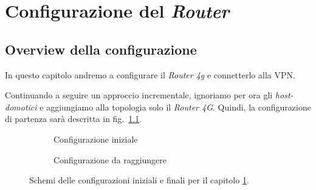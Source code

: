 
\chapter{Configurazione del \textit{Router} \ok \ok}
\label{ch:configurazione-router}

\section{Overview della configurazione \ok}

In questo capitolo andremo a configurare il \textit{Router 4g} e connetterlo alla VPN.

Continuando a seguire un approccio incrementale, ignoriamo per ora gli \textit{host-domotici} e aggiungiamo alla topologia solo il \textit{Router 4G}. Quindi, la configurazione di partenza sarà descritta in fig.~\ref{fig:conf-init-router}.

\newsavebox{\myimagea}
\begin{figure}[H]
    \centering%
    \begin{subfigure}{0.4\textwidth}
        \centering
        \usebox{\myimagea}
        \caption{Configurazione iniziale}
        \label{fig:conf-init-router}
    \end{subfigure}
    \hfill%
    \begin{subfigure}{0.5\textwidth}
        \centering
        \caption{Configurazione da raggiungere}
        \label{fig:conf-final-router}
    \end{subfigure}
    \caption{Schemi delle configurazioni iniziali e finali per il capitolo \ref{ch:configurazione-router}.}
\end{figure}

